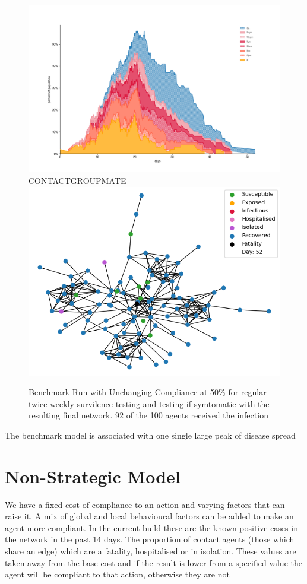 \documentclass{article}
\begin{document}
\begin{figure}
  \centering
      \includegraphics[width=\textwidth]{Figure3}CONTACTGROUPMATE
      \includegraphics[width=\textwidth]{Figure3Net}
  \caption{Benchmark Run with Unchanging Compliance at 50\% for regular twice weekly survilence testing and testing if symtomatic with the resulting final network. 92 of the 100 agents received the infection}
\end{figure}

The benchmark model is associated with one single large peak of disease spread

\newpage

\section{Non-Strategic Model}
We have a fixed cost of compliance to an action and varying factors that can raise it. A mix of global and local behavioural factors can be added to make an agent more compliant. In the current build these are the known positive cases in the network in the past 14 days. The proportion of contact agents (those which share an edge) which are a fatality, hospitalised or in isolation. These values are taken away from the base cost and if the result is lower from a specified value the agent will be compliant to that action, otherwise they are not
\end{document}
